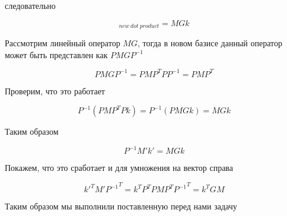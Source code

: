 \documentclass{article}
\begin{document}
    следовательно

    \begin{equation}
        [Mk]_{new \ dot \ product} = MGk
    \end{equation}

    Рассмотрим линейный оператор $MG$, тогда в новом базисе данный оператор может быть представлен как $P MG P^{-1}$

    \begin{equation}
        P MG P^{-1} = P M P^{T} P P^{-1} = P M P^{T}
    \end{equation}

    Проверим, что это работает

    \begin{equation}
        P^{-1} (P M P^{T} Pk) = P^{-1} (P M G k) = MGk
    \end{equation}

    Таким образом

    \begin{equation}
        P^{-1} M' k' = MGk
    \end{equation}

    Покажем, что это сработает и для умножения на вектор справа

    \begin{equation}
         k'^{T} M' {P^{-1}}^{T} =  k^{T} P^{T} P M P^{T} {P^{-1}}^{T} = k^{T} G M
    \end{equation}

    Таким образом мы выполнили поставленную перед нами задачу
\end{document}
